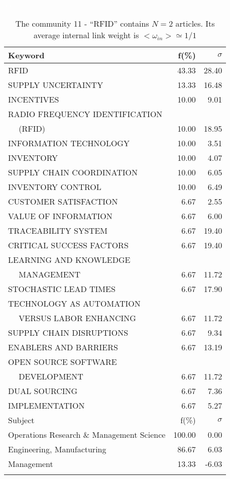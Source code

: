 \documentclass[a4paper,11pt]{report}
\begin{document}
\begin{landscape}
\begin{table}[!ht]
\caption{The community 11 - ``RFID'' contains $N = 2$ articles. Its average internal link weight is $<\omega_{in}> \simeq 1/1$ }
\textcolor{white}{aa}\\
{\scriptsize\begin{tabular}{|l r r|}
\hline
Keyword & f(\%) & $\sigma$\\
\hline
RFID & 43.33 & 28.40\\
SUPPLY UNCERTAINTY & 13.33 & 16.48\\
INCENTIVES & 10.00 & 9.01\\
RADIO FREQUENCY IDENTIFICATION &  & \\
$\quad$ (RFID) & 10.00 & 18.95\\
INFORMATION TECHNOLOGY & 10.00 & 3.51\\
INVENTORY & 10.00 & 4.07\\
SUPPLY CHAIN COORDINATION & 10.00 & 6.05\\
INVENTORY CONTROL & 10.00 & 6.49\\
CUSTOMER SATISFACTION & 6.67 & 2.55\\
VALUE OF INFORMATION & 6.67 & 6.00\\
TRACEABILITY SYSTEM & 6.67 & 19.40\\
CRITICAL SUCCESS FACTORS & 6.67 & 19.40\\
LEARNING AND KNOWLEDGE &  & \\
$\quad$ MANAGEMENT & 6.67 & 11.72\\
STOCHASTIC LEAD TIMES & 6.67 & 17.90\\
TECHNOLOGY AS AUTOMATION &  & \\
$\quad$ VERSUS LABOR ENHANCING & 6.67 & 11.72\\
SUPPLY CHAIN DISRUPTIONS & 6.67 & 9.34\\
ENABLERS AND BARRIERS & 6.67 & 13.19\\
OPEN SOURCE SOFTWARE &  & \\
$\quad$ DEVELOPMENT & 6.67 & 11.72\\
DUAL SOURCING & 6.67 & 7.36\\
IMPLEMENTATION & 6.67 & 5.27\\
\hline
\hline
Subject & f(\%) & $\sigma$\\
\hline
Operations Research \& Management Science & 100.00 & 0.00\\
Engineering, Manufacturing & 86.67 & 6.03\\
Management & 13.33 & -6.03\\
 &  & \\

\end{tabular}}
\end{table}
\end{landscape}
\end{document}
